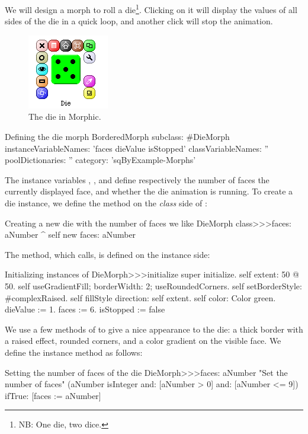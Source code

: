 \documentclass[a4paper,10pt,twoside]{book}
\begin{document}
We will design a morph to roll a die\footnote{NB: One die, two dice.}. Clicking on it will display the values of all sides of the die in a quick loop, and another click will stop the animation.

\begin{figure}[ht]
	\centerline{\includegraphics{die}}
	\caption{The die in Morphic.
		\label{fig:dialogDie}}
\end{figure}


\begin{classdef}{Defining the die morph}
BorderedMorph subclass: #DieMorph
   instanceVariableNames: 'faces dieValue isStopped'
   classVariableNames: ''
   poolDictionaries: ''
   category: 'sqByExample-Morphs'
\end{classdef}

The instance variables , , and  define respectively the number of faces the currently displayed face, and whether the die animation is running.
To create a die instance, we define the  method on the \emph{class} side of :
\begin{method}{Creating a new die with the number of faces we like}
DieMorph class>>>faces: aNumber
   ^ self new faces: aNumber
\end{method}

The  method, which  calls, is defined on the instance side:
\begin{method}{Initializing instances of }
DieMorph>>>initialize
   super initialize.
   self extent: 50 @ 50.
   self useGradientFill; borderWidth: 2; useRoundedCorners.
   self setBorderStyle: #complexRaised.
   self fillStyle direction: self extent.
   self color: Color green.
   dieValue := 1.
   faces := 6.
   isStopped := false
\end{method}

We use a few methods of  to give a nice appearance to the die: a thick border with a raised effect, rounded corners, and a color gradient on the visible face.
We define the  instance method as follows:
\begin{method}{Setting the number of faces of the die}
DieMorph>>>faces: aNumber
   "Set the number of faces"
   (aNumber isInteger
         and: [aNumber > 0]
         and: [aNumber <= 9])
      ifTrue: [faces := aNumber]
\end{method}
\end{document}

